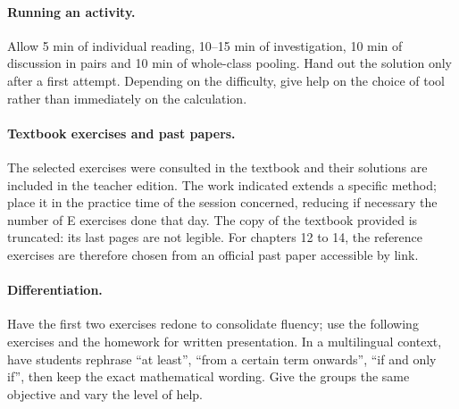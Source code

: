 \paragraph{Running an activity.} Allow 5 min of individual reading, 10--15 min of investigation, 10 min of discussion in pairs and 10 min of whole-class pooling. Hand out the solution only after a first attempt. Depending on the difficulty, give help on the choice of tool rather than immediately on the calculation.
\paragraph{Textbook exercises and past papers.} The selected exercises were consulted in the textbook and their solutions are included in the teacher edition. The work indicated extends a specific method; place it in the practice time of the session concerned, reducing if necessary the number of E exercises done that day. The copy of the textbook provided is truncated: its last pages are not legible. For chapters 12 to 14, the reference exercises are therefore chosen from an official past paper accessible by link.
\paragraph{Differentiation.} Have the first two exercises redone to consolidate fluency; use the following exercises and the homework for written presentation. In a multilingual context, have students rephrase ``at least'', ``from a certain term onwards'', ``if and only if'', then keep the exact mathematical wording. Give the groups the same objective and vary the level of help.
